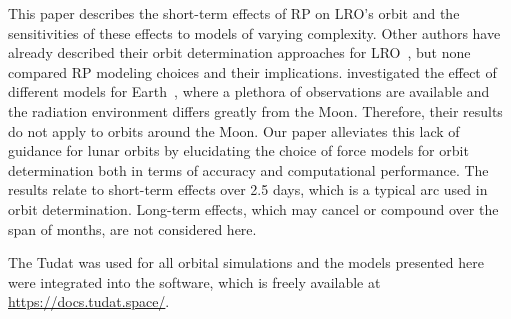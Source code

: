 This paper describes the short-term effects of \gls{RP} on \gls{LRO}'s orbit and the sensitivities of these effects to models of varying complexity. Other authors have already described their orbit determination approaches for \gls{LRO}~\cite{Mazarico2011,Mazarico2018,Nicholson2010,Smith2008,Slojkowski2014,Slojkowski2015,Bauer2016,Maier2016}, but none compared \gls{RP} modeling choices and their implications. \citeauthor{Vielberg2020} investigated the effect of different models for Earth~\cite{Vielberg2020}, where a plethora of observations are available and the radiation environment differs greatly from the Moon. Therefore, their results do not apply to orbits around the Moon. Our paper alleviates this lack of guidance for lunar orbits by elucidating the choice of force models for orbit determination both in terms of accuracy and computational performance. The results relate to short-term effects over 2.5 days, which is a typical arc used in orbit determination. Long-term effects, which may cancel or compound over the span of months, are not considered here.

The \gls{Tudat} was used for all orbital simulations and the models presented here were integrated into the software, which is freely available at \url{https://docs.tudat.space/}.

{\let\thefootnote\relax{}}
